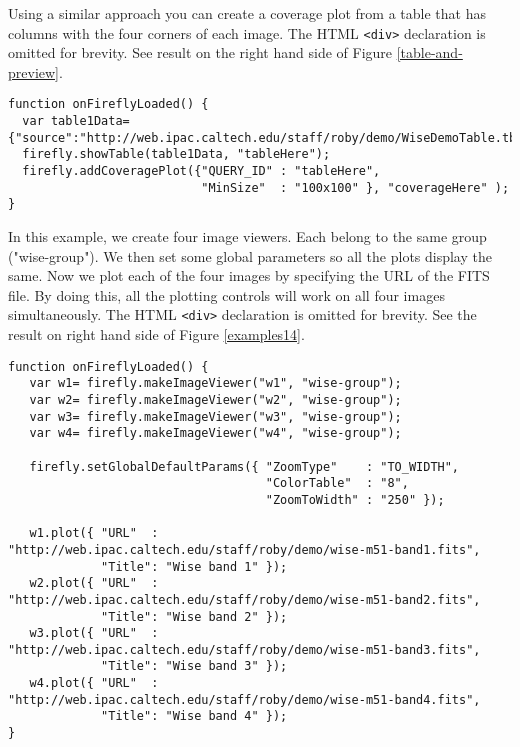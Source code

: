 Using a similar approach you can create a coverage plot from a table that has columns with the four corners of each image. The HTML \scriptsize\texttt{<div>} \normalsize declaration is omitted for brevity. See result on the right hand side of Figure \ref{table-and-preview}.
\normalsize

\scriptsize
\begin{verbatim}
function onFireflyLoaded() {
  var table1Data={"source":"http://web.ipac.caltech.edu/staff/roby/demo/WiseDemoTable.tbl"};
  firefly.showTable(table1Data, "tableHere");
  firefly.addCoveragePlot({"QUERY_ID" : "tableHere",
                           "MinSize"  : "100x100" }, "coverageHere" );
}
\end{verbatim}
\normalsize

In this example, we create four image viewers. Each belong to the same group ("wise-group").  We then set some global parameters so all the plots display the same. Now we plot each of the four images by specifying the URL of the FITS file. By doing this, all the plotting controls will work on all four images simultaneously. The HTML \scriptsize\texttt{<div>} \normalsize declaration is omitted for brevity. See the result on right hand side of Figure \ref{examples14}.

\scriptsize
\begin{verbatim}
function onFireflyLoaded() {
   var w1= firefly.makeImageViewer("w1", "wise-group");
   var w2= firefly.makeImageViewer("w2", "wise-group");
   var w3= firefly.makeImageViewer("w3", "wise-group");
   var w4= firefly.makeImageViewer("w4", "wise-group");

   firefly.setGlobalDefaultParams({ "ZoomType"    : "TO_WIDTH",
                                    "ColorTable"  : "8",
                                    "ZoomToWidth" : "250" });

   w1.plot({ "URL"  : "http://web.ipac.caltech.edu/staff/roby/demo/wise-m51-band1.fits",
             "Title": "Wise band 1" });
   w2.plot({ "URL"  : "http://web.ipac.caltech.edu/staff/roby/demo/wise-m51-band2.fits",
             "Title": "Wise band 2" });
   w3.plot({ "URL"  : "http://web.ipac.caltech.edu/staff/roby/demo/wise-m51-band3.fits",
             "Title": "Wise band 3" });
   w4.plot({ "URL"  : "http://web.ipac.caltech.edu/staff/roby/demo/wise-m51-band4.fits",
             "Title": "Wise band 4" });
}
\end{verbatim}
\normalsize



